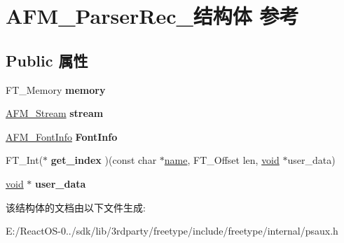 \hypertarget{struct_a_f_m___parser_rec__}{}\section{A\+F\+M\+\_\+\+Parser\+Rec\+\_\+结构体 参考}
\label{struct_a_f_m___parser_rec__}
\subsection*{Public 属性}
\begin{DoxyCompactItemize}
\item 
\mbox{\label{struct_a_f_m___parser_rec___a3fec8b1760fa9261f48ee87dc2b3858b}} 
F\+T\+\_\+\+Memory {\bfseries memory}
\item 
\mbox{\label{struct_a_f_m___parser_rec___adf3b1165216cbd1f7ec7ae736fd4270a}} 
\hyperlink{struct_a_f_m___stream_rec__}{A\+F\+M\+\_\+\+Stream} {\bfseries stream}
\item 
\mbox{\label{struct_a_f_m___parser_rec___ae53d6cddac32a0eb7014c3a9f74517df}} 
\hyperlink{struct_a_f_m___font_info_rec__}{A\+F\+M\+\_\+\+Font\+Info} {\bfseries Font\+Info}
\item 
\mbox{\label{struct_a_f_m___parser_rec___a9d33b62410351d72878f0f14007e7385}} 
F\+T\+\_\+\+Int($\ast$ {\bfseries get\+\_\+index} )(const char $\ast$\hyperlink{structname}{name}, F\+T\+\_\+\+Offset len, \hyperlink{interfacevoid}{void} $\ast$user\+\_\+data)
\item 
\mbox{\label{struct_a_f_m___parser_rec___a9fa78a781737bf27e00448c5092b7657}} 
\hyperlink{interfacevoid}{void} $\ast$ {\bfseries user\+\_\+data}
\end{DoxyCompactItemize}


该结构体的文档由以下文件生成\+:\begin{DoxyCompactItemize}
\item 
E\+:/\+React\+O\+S-\/0../sdk/lib/3rdparty/freetype/include/freetype/internal/psaux.\+h\end{DoxyCompactItemize}
